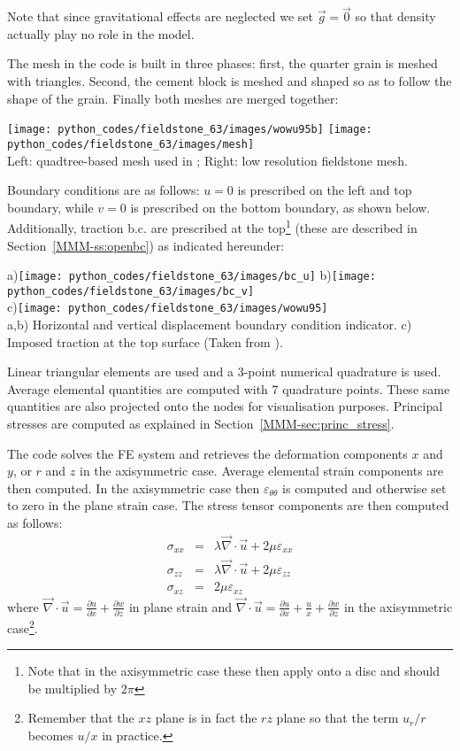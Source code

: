 Note that since gravitational effects are neglected we set $\vec{g}=\vec{0}$
so that density actually play no role in the model.

The mesh in the code is built in three phases: first, the quarter grain is meshed 
with triangles. Second, the cement block is meshed and shaped so as to follow the 
shape of the grain. Finally both meshes are merged together:

\begin{center}
\texttt{[image: python\_codes/fieldstone\_63/images/wowu95b]}
\texttt{[image: python\_codes/fieldstone\_63/images/mesh]}\\
{\captionfont Left: quadtree-based mesh used in \cite{wowu95}; 
Right: low resolution fieldstone mesh.}
\end{center}

Boundary conditions are as follows: $u=0$ is prescribed on the left and top boundary, 
while $v=0$ is prescribed on the bottom boundary, as shown below.
Additionally, traction b.c. are prescribed at the top\footnote{Note that 
in the axisymmetric case these then apply onto a disc and should be multiplied by $2\pi$} (these
are described in Section~\ref{MMM-ss:openbc}) as indicated hereunder:
\begin{center}
a)\texttt{[image: python\_codes/fieldstone\_63/images/bc\_u]}
b)\texttt{[image: python\_codes/fieldstone\_63/images/bc\_v]}\\
c)\texttt{[image: python\_codes/fieldstone\_63/images/wowu95]}\\
{\captionfont a,b) Horizontal and vertical displacement boundary condition indicator.
c) Imposed traction at the top surface (Taken from \cite{wowu95}).}
\end{center}

Linear triangular elements are used and a 3-point numerical quadrature is used.
Average elemental quantities are computed with 7 quadrature points.
These same quantities are also projected onto the nodes for visualisation purposes.
Principal stresses are computed as explained in Section~\ref{MMM-sec:princ_stress}.

The code solves the FE system and retrieves the deformation components $x$ and $y$,
or $r$ and $z$ in the axisymmetric case.
Average elemental strain components are then computed. In the axisymmetric case
then  $\varepsilon_{\theta\theta}$ is computed and otherwise set to zero in the plane strain case.
The stress tensor components are then computed as follows:
\begin{eqnarray}
\sigma_{xx} &=& \lambda \vec\nabla\cdot\vec{u} + 2\mu \varepsilon_{xx} \\
\sigma_{zz} &=& \lambda \vec\nabla\cdot\vec{u} + 2\mu \varepsilon_{zz} \\
\sigma_{xz} &=&  2\mu \varepsilon_{xz} 
\end{eqnarray}
where $\vec\nabla\cdot\vec{u}=\frac{\partial u}{\partial x} + \frac{\partial w}{\partial z}$
in plane strain and 
$\vec\nabla\cdot\vec{u}=\frac{\partial u}{\partial x} + \frac{u}{x} + \frac{\partial w}{\partial z}$
in the axisymmetric case\footnote{Remember that the $xz$ plane is in fact the $rz$ plane so that 
the term $u_r/r$ becomes $u/x$ in practice.}.


